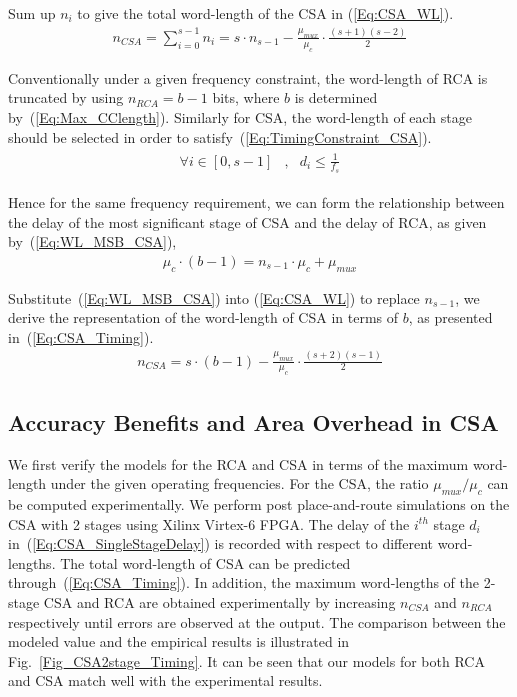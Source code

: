 \documentclass[prodmode,acmtrets]{acmsmall} %
\begin{document}
Sum up $n_i$ to give the total word-length of the CSA in (\ref{Eq:CSA_WL}).
%
\begin{eqnarray}\label{Eq:CSA_WL}
    n_{CSA} =\sum_{i=0}^{s-1}n_{i}= s\cdot n_{s-1}-\frac{\mu_{mux}}{\mu_{c}}\cdot\frac{(s+1)(s-2)}{2}
\end{eqnarray}

Conventionally under a given frequency constraint, the word-length of RCA is truncated by using $n_{RCA}=b-1$ bits, where $b$ is determined by~(\ref{Eq:Max_CClength}). Similarly for CSA, the word-length of each stage should be selected in order to satisfy~(\ref{Eq:TimingConstraint_CSA}).
%
\begin{eqnarray}\label{Eq:TimingConstraint_CSA}
  \begin{matrix}
    \forall i\in[0,s-1] &, & d_i\leqslant\frac{1}{f_s}
  \end{matrix}
\end{eqnarray}

Hence for the same frequency requirement, we can form the relationship between the delay of the most significant stage of CSA and the delay of RCA, as given by~(\ref{Eq:WL_MSB_CSA}),
%
\begin{eqnarray}\label{Eq:WL_MSB_CSA}
    \mu_c\cdot (b-1) = n_{s-1}\cdot\mu_c+\mu_{mux}
\end{eqnarray}

Substitute~(\ref{Eq:WL_MSB_CSA}) into (\ref{Eq:CSA_WL}) to replace $n_{s-1}$, we derive the representation of the word-length of CSA in terms of $b$, as presented in~(\ref{Eq:CSA_Timing}).
%
\begin{eqnarray}\label{Eq:CSA_Timing}
  n_{CSA}=s\cdot (b-1)-\frac{\mu_{mux}}{\mu_{c}}\cdot\frac{(s+2)(s-1)}{2}
\end{eqnarray}

\subsection{Accuracy Benefits and Area Overhead in CSA}
We first verify the models for the RCA and CSA in terms of the maximum word-length under the given operating frequencies. For the CSA, the ratio $\mu_{mux}/\mu_c$ can be computed experimentally. We perform post place-and-route simulations on the CSA with 2 stages using Xilinx Virtex-6 FPGA. The delay of the $i^{th}$ stage $d_i$ in~(\ref{Eq:CSA_SingleStageDelay}) is recorded with respect to different word-lengths. The total word-length of CSA can be predicted through~(\ref{Eq:CSA_Timing}). In addition, the maximum word-lengths of the 2-stage CSA and RCA are obtained experimentally by increasing $n_{CSA}$ and $n_{RCA}$ respectively until errors are observed at the output. The comparison between the modeled value and the empirical results is illustrated in Fig.~\ref{Fig_CSA2stage_Timing}. It can be seen that our models for both RCA and CSA match well with the experimental results.
\end{document}
